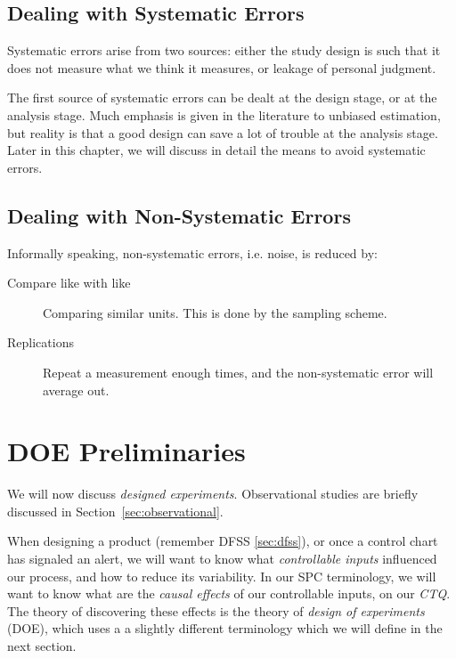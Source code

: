 \subsection{Dealing with Systematic Errors}

Systematic errors arise from two sources: either the study design is such that it does not measure what we think it measures, or leakage of personal judgment.

The first source of systematic errors can be dealt at the design stage, or at the analysis stage.
Much emphasis is given in the literature to unbiased estimation, but reality is that a good design can save a lot of trouble at the analysis stage. 
Later in this chapter, we will discuss in detail the means to avoid systematic errors. 


\subsection{Dealing with Non-Systematic Errors}

Informally speaking, non-systematic errors, i.e. noise, is reduced by:
\begin{description}
	\item [Compare like with like] Comparing similar units. This is done by the sampling scheme. 
	\item [Replications] 
	Repeat a measurement enough times, and the non-systematic error will average out. 
\end{description} 







\section{DOE Preliminaries}
\label{sec:DOE_preliminaries}

We will now discuss \emph{designed experiments}. 
Observational studies are briefly discussed in Section~\ref{sec:observational}.

When designing a product (remember DFSS \ref{sec:dfss}), or once a control chart has signaled an alert, we will want to know what \emph{controllable inputs} influenced our process, and how to reduce its variability.
In our SPC terminology, we will want to know what are the \emph{causal effects} of our controllable inputs, on our \emph{CTQ}. 
The theory of discovering these effects is the theory of \emph{design of experiments} (DOE), which uses a a slightly different terminology which we will define in the next section.


